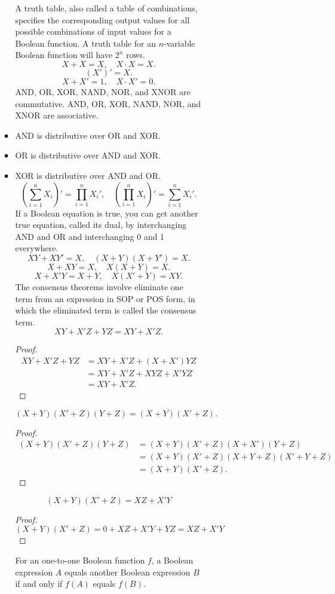 \documentclass[a4paper,12pt]{report}
\begin{document}
\begin{itemize}
\begin{itemize}
\begin{itemize}
\begin{itemize}
\begin{itemize}
\begin{itemize}
\begin{itemize}
\begin{itemize}
A truth table, also called a table of combinations, specifies the corresponding output values for all possible combinations of input values for a Boolean function. A truth table for an $n$-variable Boolean function will have $2^n$ rows.
\[X + X = X,\quad X\cdot X = X.\]
\[(X′)′ = X.\]
\[X + X′ = 1 ,\quad X\cdot X′ = 0 .\]
AND, OR, XOR, NAND, NOR, and XNOR are commutative.
AND, OR, XOR, NAND, NOR, and XNOR are associative.
\bit
\item AND is distributive over OR and XOR.
\item OR is distributive over AND and XOR.
\item XOR is distributive over AND and OR.
\eit
{}
\[(\sum_{i=1}^nX_i)′=\prod_{i=1}^nX_i',\quad (\prod_{i=1}^nX_i)'=\sum_{i=1}^nX_i'.\]
If a Boolean equation is true, you can get another true equation, called its dual, by interchanging AND and OR and interchanging 0 and 1 everywhere.
\[XY+XY'=X,\quad (X+Y)(X+Y')=X.\]
\[X+XY=X,\quad X(X+Y)=X.\]
\[X+X'Y=X+Y,\quad X(X'+Y)=XY.\]
The consensus theorems involve eliminate one term from an expression in SOP or POS form, in which the eliminated term is called the consensus term.
\[XY+X′Z+YZ=XY+X′Z.\]
\begin{proof}
\[\begin{aligned}
XY+X′Z+YZ&=XY+X'Z+(X+X')YZ\\
&=XY+X'Z+XYZ+X'YZ\\
&=XY+X′Z.
\end{aligned}\]
\end{proof}
\[(X+Y)(X′+Z)(Y+Z)=(X+Y)(X′+Z).\]
\begin{proof}
\[\begin{aligned}
(X+Y)(X′+Z)(Y+Z)&=(X+Y)(X'+Z)(X+X')(Y+Z)\\
&=(X+Y)(X'+Z)(X+Y+Z)(X'+Y+Z)\\
&=(X+Y)(X′+Z).
\end{aligned}\]
\end{proof}
\[(X+Y)(X'+Z)=XZ+X'Y\]
\begin{proof}
\[(X+Y)(X'+Z)=0+XZ+X'Y+YZ=XZ+X'Y\]
\end{proof}
For an one-to-one Boolean function $f$, a Boolean expression $A$ equals another Boolean expression $B$ if and only if $f(A)$ equals $f(B)$.

\end{itemize}
\end{itemize}
\end{itemize}
\end{itemize}
\end{itemize}
\end{itemize}
\end{itemize}
\end{itemize}
\end{document}
